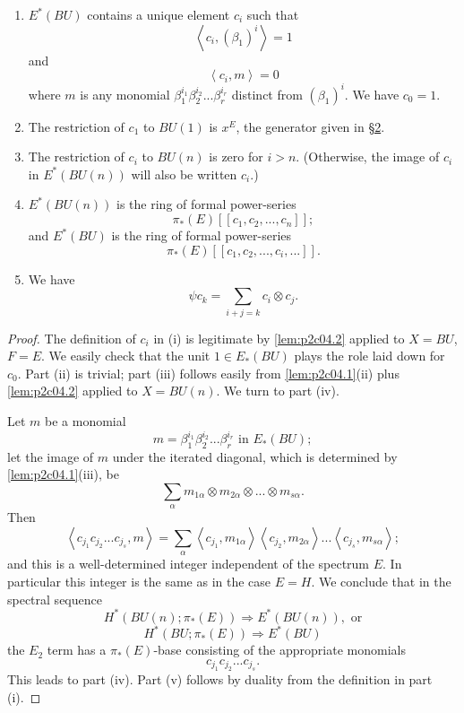 \documentclass[../main]{subfiles}
\begin{document}
\begin{lemma}
\label{lem:p2c04.3}
\begin{enumerate}
    \item $E^\ast(BU)$ contains a unique element $c_i$ such that 
    $$\left<c_i,(\beta_1)^i\right>=1$$
    and 
    $$\left<c_i,m\right>=0$$
    where $m$ is any monomial $\beta_1^{i_1}\beta_2^{i_2}...\beta_r^{i_r}$ distinct from $(\beta_1)^i$. We have $c_0=1$.
    \item The restriction of $c_1$ to $BU(1)$ is $x^E$, the generator given in \hyperref[sec:p2c2]{\S 2}.
    \item The restriction of $c_i$ to $BU(n)$ is zero for $i>n$. (Otherwise, the image of $c_i$ in $E^\ast(BU(n))$ will also be written $c_i$.)
    \item $E^\ast(BU(n))$ is the ring of formal power-series
    $$\pi_\ast(E)[[c_1,c_2,...,c_n]];$$
    and $E^\ast(BU)$ is the ring of formal power-series
    $$\pi_\ast(E)[[c_1,c_2,...,c_i,...]].$$
    \item We have
    $$\psi c_k=\sum_{i+j=k}c_i\otimes c_j.$$
\end{enumerate}
\end{lemma}
\begin{proof}
The definition of $c_i$ in (i) is legitimate by \eqref{lem:p2c04.2} applied to $X=BU$, $F=E$. We easily check that the unit $1\in E_\ast(BU)$ plays the role laid down for $c_0$. Part (ii) is trivial; part (iii) follows easily from \eqref{lem:p2c04.1}(ii) plus \eqref{lem:p2c04.2} applied to $X=BU(n)$. We turn to part (iv).

Let $m$ be a monomial
$$m=\beta_1^{i_1}\beta_2^{i_2}...\beta_r^{i_r} \text{ in } E_\ast(BU);$$
let the image of $m$ under the iterated diagonal, which is determined by \eqref{lem:p2c04.1}(iii), be 
$$\sum_\alpha m_{1\alpha}\otimes m_{2\alpha} \otimes ... \otimes m_{s\alpha}.$$
Then 
$$\left<c_{j_1}c_{j_2}...c_{j_s},m\right> = \sum_\alpha\left<c_{j_1},m_{1\alpha}\right>\left<c_{j_2},m_{2\alpha}\right>...\left<c_{j_s},m_{s\alpha}\right>;$$
and this is a well-determined integer independent of the spectrum $E$. In particular this integer is the same as in the case $E=H$. We conclude that in the spectral sequence
$$H^\ast(BU(n);\pi_\ast(E))\Longrightarrow E^\ast(BU(n)), \text{ or}$$
$$H^\ast(BU;\pi_\ast(E))\Longrightarrow E^\ast(BU)$$
the $E_2$ term has a $\pi_\ast(E)$-base consisting of the appropriate monomials 
$$c_{j_1}c_{j_2}...c_{j_s}.$$
This leads to part (iv). Part (v) follows by duality from the definition in part (i).
\end{proof}
\end{document}
